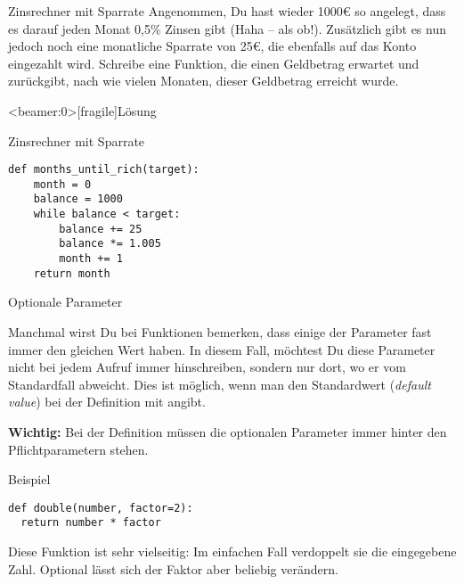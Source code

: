 \begin{fragile}[Übung]
\begin{block}{Zinsrechner mit Sparrate}
\vspace{2pt}
Angenommen, Du hast wieder 1000€ so angelegt, dass es darauf jeden Monat 0,5\% Zinsen gibt (Haha -- als ob!). Zusätzlich gibt es nun jedoch noch eine monatliche Sparrate von 25€, die ebenfalls auf das Konto eingezahlt wird. 
Schreibe eine Funktion, die einen Geldbetrag erwartet und zurückgibt, nach wie vielen Monaten, dieser Geldbetrag erreicht wurde. 
\end{block}
\end{fragile}

\begin{frame}<beamer:0>[fragile]{Lösung}

\begin{solutionblock}{Zinsrechner mit Sparrate}
\begin{verbatim}
def months_until_rich(target):
    month = 0
    balance = 1000
    while balance < target:
        balance += 25
        balance *= 1.005
        month += 1
    return month
\end{verbatim}
\end{solutionblock}
\end{frame}



\begin{fragile}

\begin{block}{Optionale Parameter}
	
	\pause 
	
\vspace{2pt}
Manchmal wirst Du bei Funktionen bemerken, dass einige der Parameter fast immer den gleichen Wert haben. In diesem Fall, möchtest Du diese Parameter nicht bei jedem Aufruf immer hinschreiben, sondern nur dort, wo er vom Standardfall abweicht. Dies ist möglich, wenn man den Standardwert (\emph{default value}) bei der Definition mit angibt. 

\pause 

\textbf{Wichtig:} Bei der Definition müssen die optionalen Parameter immer hinter den Pflichtparametern stehen.
\end{block}

\vspace{12pt}
\pause 

\begin{exampleblock}{Beispiel}
\begin{verbatim}
def double(number, factor=2): 
  return number * factor
\end{verbatim} 


\pause 

Diese Funktion ist sehr vielseitig: Im einfachen Fall verdoppelt sie die eingegebene Zahl. Optional lässt sich der Faktor aber beliebig verändern. 
\end{exampleblock}

\end{fragile}


